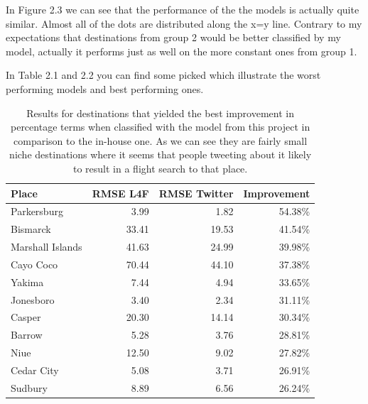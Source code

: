 \documentclass[minf,frontabs,twoside,singlespacing,parskip]{infthesis}
\begin{document}
In Figure 2.3 we can see that the performance of the the models is actually quite similar. Almost all of the dots are distributed along the x=y line. Contrary to my expectations that destinations from group 2 would be better classified by my model, actually it performs just as well on the more constant ones from group 1. 

In Table 2.1 and 2.2 you can find some picked which illustrate the worst performing models and best performing ones.

\begin{table}[]
\begin{center}
\begin{tabular}{ l | r | r | r}
Place & RMSE L4F & RMSE Twitter & Improvement \\
\hline
Parkersburg & 3.99 & 1.82 & 54.38\% \\
Bismarck & 33.41 & 19.53 & 41.54\% \\
Marshall Islands & 41.63 & 24.99 & 39.98\% \\
Cayo Coco & 70.44 & 44.10 & 37.38\% \\
Yakima & 7.44 & 4.94 & 33.65\% \\
Jonesboro & 3.40 & 2.34 & 31.11\% \\
Casper & 20.30 & 14.14 & 30.34\% \\
Barrow & 5.28 & 3.76 & 28.81\% \\
Niue & 12.50 & 9.02 & 27.82\% \\
Cedar City & 5.08 & 3.71 & 26.91\% \\
Sudbury & 8.89 & 6.56 & 26.24\% \\
\end{tabular}
\end{center}
\caption{Results for destinations that yielded the best improvement in percentage terms when classified with the model from this project in comparison to the in-house one. As we can see they are fairly small niche destinations where it seems that people tweeting about it likely to result in a flight search to that place.}
\end{table}
\end{document}
